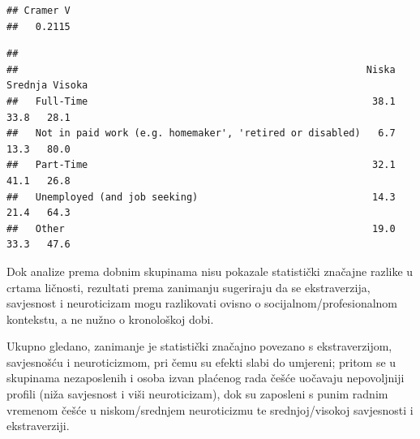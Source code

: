 \documentclass[
]{article}
\newenvironment{Shaded}{\begin{snugshade}}{\end{snugshade}}
\newcommand{\CommentTok}[1]{\textcolor[rgb]{0.56,0.35,0.01}{\textit{#1}}}
\newcommand{\DecValTok}[1]{\textcolor[rgb]{0.00,0.00,0.81}{#1}}
\newcommand{\FunctionTok}[1]{\textcolor[rgb]{0.13,0.29,0.53}{\textbf{#1}}}
\newcommand{\NormalTok}[1]{#1}
\newcommand{\OtherTok}[1]{\textcolor[rgb]{0.56,0.35,0.01}{#1}}
\newcommand{\SpecialCharTok}[1]{\textcolor[rgb]{0.81,0.36,0.00}{\textbf{#1}}}
\begin{document}
\begin{Shaded}
\end{Shaded}

\begin{verbatim}
## Cramer V 
##   0.2115
\end{verbatim}

\begin{Shaded}
\end{Shaded}

\begin{verbatim}
##                                                           
##                                                            Niska Srednja Visoka
##   Full-Time                                                 38.1    33.8   28.1
##   Not in paid work (e.g. homemaker', 'retired or disabled)   6.7    13.3   80.0
##   Part-Time                                                 32.1    41.1   26.8
##   Unemployed (and job seeking)                              14.3    21.4   64.3
##   Other                                                     19.0    33.3   47.6
\end{verbatim}

Dok analize prema dobnim skupinama nisu pokazale statistički značajne
razlike u crtama ličnosti, rezultati prema zanimanju sugeriraju da se
ekstraverzija, savjesnost i neuroticizam mogu razlikovati ovisno o
socijalnom/profesionalnom kontekstu, a ne nužno o kronološkoj dobi.

Ukupno gledano, zanimanje je statistički značajno povezano s
ekstraverzijom, savjesnošću i neuroticizmom, pri čemu su efekti slabi do
umjereni; pritom se u skupinama nezaposlenih i osoba izvan plaćenog rada
češće uočavaju nepovoljniji profili (niža savjesnost i viši
neuroticizam), dok su zaposleni s punim radnim vremenom češće u
niskom/srednjem neuroticizmu te srednjoj/visokoj savjesnosti i
ekstraverziji.
\end{document}
